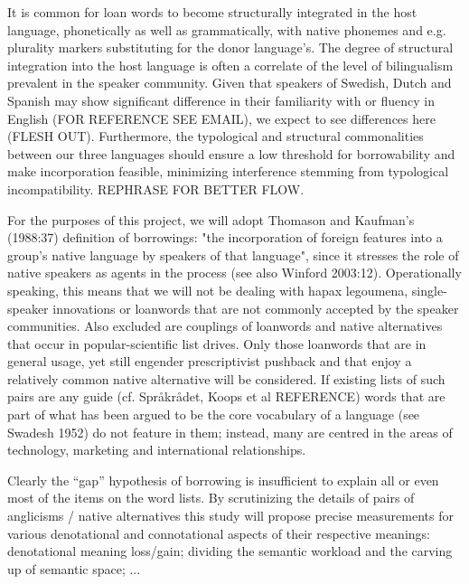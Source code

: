 \documentclass[a4paper]{article}
\begin{document}
It is common for loan words to become structurally integrated in the host language, phonetically as well as grammatically, with native phonemes and e.g. plurality markers substituting for the donor language's. The degree of structural integration into the host language is often a correlate of the level of bilingualism prevalent in the speaker community. Given that speakers of Swedish, Dutch and Spanish may show significant difference in their familiarity with or fluency in English (FOR REFERENCE SEE EMAIL), we expect to see differences here (FLESH OUT). Furthermore, the typological and structural commonalities between our three languages should ensure a low threshold for borrowability and make incorporation feasible, minimizing interference stemming from typological incompatibility. REPHRASE FOR BETTER FLOW.

For the purposes of this project, we will adopt Thomason and Kaufman's (1988:37) definition of borrowings: "the incorporation of foreign features into a group's native language by speakers of that language", since it stresses the role of native speakers as agents in the process (see also Winford 2003:12). Operationally speaking, this means that we will not be dealing with hapax legoumena, single-speaker innovations or loanwords that are not commonly accepted by the speaker communities. Also excluded are couplings of loanwords and native alternatives that occur in popular-scientific list drives. Only those loanwords that are in general usage, yet still engender prescriptivist pushback and that enjoy a relatively common native alternative will be considered. If existing lists of such pairs are any guide (cf. Spr\aa kr\aa det, Koops et al REFERENCE) words that are part of what has been argued to be the core vocabulary of a language (see Swadesh 1952) do not feature in them; instead, many are centred in the areas of technology, marketing and international relationships. 

Clearly the ``gap'' hypothesis of borrowing is insufficient to explain all or even most of the items on the word lists. By scrutinizing the details of pairs of anglicisms / native alternatives this study will propose precise measurements for various denotational and connotational aspects of their respective meanings: denotational meaning loss/gain; dividing the semantic workload and the carving up of semantic space; ...

\end{document}
